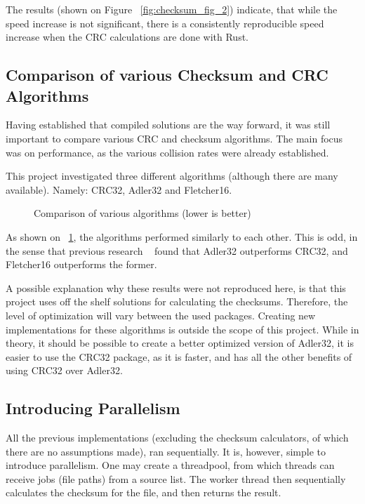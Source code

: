 The results (shown on Figure ~\ref{fig:checksum_fig_2}) indicate,
that while the speed increase is not significant,
there is a consistently reproducible speed increase when the CRC calculations are done with Rust.


\subsection{Comparison of various Checksum and CRC Algorithms}

Having established that compiled solutions are the way forward, it was still important to compare various CRC and checksum algorithms.
The main focus was on performance, as the various collision rates were already established.

This project investigated three different algorithms (although there are many available).
Namely:
CRC32, Adler32 and Fletcher16.

\begin{figure}[H]
    \centering
    \begin{bchart}[step=50,max=400, unit=s]
        \medskip
        \medskip
    \end{bchart}
    \caption{Comparison of various algorithms (lower is better)}
    \label{fig:checksum_fig_3}
\end{figure}

As shown on ~\ref{fig:checksum_fig_3}, the algorithms performed similarly to each other.
This is odd, in the sense that previous research ~\cite{MaxinoChecksum} found that Adler32 outperforms CRC32,
and Fletcher16 outperforms the former.

A possible explanation why these results were not reproduced here, is that this project uses off the shelf
solutions for calculating the checksums.
Therefore, the level of optimization will vary between the used packages.
Creating new implementations for these algorithms is outside the scope of this project.
While in theory, it should be possible to create a better optimized version of Adler32, it is easier
to use the CRC32 package, as it is faster, and has all the other benefits of using CRC32 over Adler32.

\subsection{Introducing Parallelism}
All the previous implementations (excluding the checksum calculators, of which there are no assumptions made),
ran sequentially.
It is, however, simple to introduce parallelism.
One may create a threadpool, from which threads can receive jobs (file paths) from a source list.
The worker thread then sequentially calculates the checksum for the file, and then returns the result.


